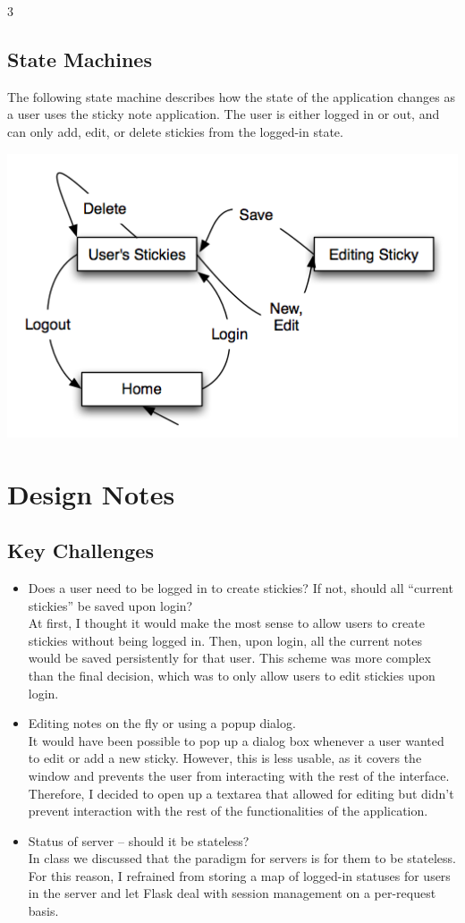 3\documentclass[11pt,letterpaper]{article}
\begin{document}
\subsection{State Machines}
The following state machine describes how the state of the application changes as a user uses the sticky note application. The user is either logged in or out, and can only add, edit, or delete stickies from the logged-in state.
\begin{center}
\includegraphics[width=7in]{dot/statediagram.png}
\label{fig:sm1} 
\end{center}

\section{Design Notes}
\subsection{Key Challenges}
\begin{itemize}
\item Does a user need to be logged in to create stickies? If not, should all ``current stickies'' be saved upon login?\\
At first, I thought it would make the most sense to allow users to create stickies without being logged in. Then, upon login, all the current notes would be saved persistently for that user. This scheme was more complex than the final decision, which was to only allow users to edit stickies upon login.
\item Editing notes on the fly or using a popup dialog.\\
It would have been possible to pop up a dialog box whenever a user wanted to edit or add a new sticky. However, this is less usable, as it covers the window and prevents the user from interacting with the rest of the interface. Therefore, I decided to open up a textarea that allowed for editing but didn't prevent interaction with the rest of the functionalities of the application.
\item Status of server -- should it be stateless?\\
In class we discussed that the paradigm for servers is for them to be stateless. For this reason, I refrained from storing a map of logged-in statuses for users in the server and let Flask deal with session management on a per-request basis.
\end{itemize}
\end{document}
